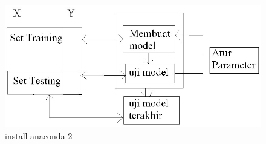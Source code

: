 \begin{enumerate}
\begin{itemize}
\begin{figure}[ht]
\centering
\includegraphics[scale=0.5]{figures/Screenshot_2.jpg}
\caption{install anaconda 2}
\label{contoh}
\end{figure}

\end{itemize}
\end{enumerate} 


